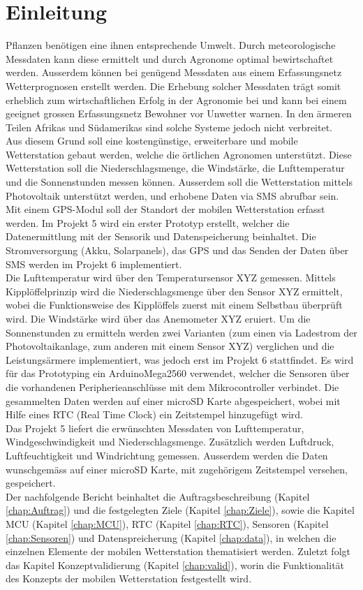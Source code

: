 \section{Einleitung}
Pflanzen benötigen eine ihnen entsprechende Umwelt. Durch meteorologische Messdaten kann diese ermittelt und durch Agronome optimal bewirtschaftet werden. Ausserdem können bei genügend Messdaten aus einem Erfassungsnetz Wetterprognosen erstellt werden. Die Erhebung solcher Messdaten trägt somit erheblich zum wirtschaftlichen Erfolg in der Agronomie bei und kann bei einem geeignet grossen Erfassungsnetz Bewohner vor Unwetter warnen. In den ärmeren Teilen Afrikas und Südamerikas sind solche Systeme jedoch nicht verbreitet.\\[0.5cm]
Aus diesem Grund soll eine kostengünstige, erweiterbare und mobile Wetterstation gebaut werden, welche die örtlichen Agronomen unterstützt. Diese Wetterstation soll die Niederschlagsmenge, die Windstärke, die Lufttemperatur und die Sonnenstunden messen können. Ausserdem soll die Wetterstation mittels Photovoltaik unterstützt werden, und erhobene Daten via SMS abrufbar sein. Mit einem GPS-Modul soll der Standort der mobilen Wetterstation erfasst werden. Im Projekt 5 wird ein erster Prototyp erstellt, welcher die Datenermittlung mit der Sensorik und Datenspeicherung beinhaltet. Die Stromversorgung (Akku, Solarpanels), das GPS und das Senden der Daten über SMS werden im Projekt 6 implementiert.\\[0.5cm]
Die Lufttemperatur wird über den Temperatursensor XYZ gemessen. Mittels Kipplöffelprinzip wird die Niederschlagsmenge über den Sensor XYZ ermittelt, wobei die Funktionsweise des Kipplöffels zuerst mit einem Selbstbau überprüft wird. Die Windstärke wird über das Anemometer XYZ eruiert. Um die Sonnenstunden zu ermitteln werden zwei Varianten (zum einen via Ladestrom der Photovoltaikanlage, zum anderen mit einem Sensor XYZ) verglichen und die Leistungsärmere implementiert, was jedoch erst im Projekt 6 stattfindet. Es wird für das Prototyping ein ArduinoMega2560 verwendet, welcher die Sensoren über die vorhandenen Peripherieanschlüsse mit dem Mikrocontroller verbindet. Die gesammelten Daten werden auf einer microSD Karte abgespeichert, wobei mit Hilfe eines RTC (Real Time Clock) ein Zeitstempel hinzugefügt wird.\\[0.5cm]
Das Projekt 5 liefert die erwünschten Messdaten von Lufttemperatur, Windgeschwindigkeit und Niederschlagsmenge. Zusätzlich werden Luftdruck, Luftfeuchtigkeit und Windrichtung gemessen. Ausserdem werden die Daten wunschgemäss auf einer microSD Karte, mit zugehörigem Zeitstempel versehen, gespeichert.\\[0.5cm]
Der nachfolgende Bericht beinhaltet die Auftragsbeschreibung (Kapitel \ref{chap:Auftrag}) und die festgelegten Ziele (Kapitel \ref{chap:Ziele}), sowie die Kapitel MCU (Kapitel \ref{chap:MCU}), RTC (Kapitel \ref{chap:RTC}), Sensoren (Kapitel \ref{chap:Sensoren}) und Datenspreicherung (Kapitel \ref{chap:data}), in welchen die einzelnen Elemente der mobilen Wetterstation thematisiert werden. Zuletzt folgt das Kapitel Konzeptvalidierung (Kapitel \ref{chap:valid}), worin die Funktionalität des Konzepts der mobilen Wetterstation festgestellt wird.
